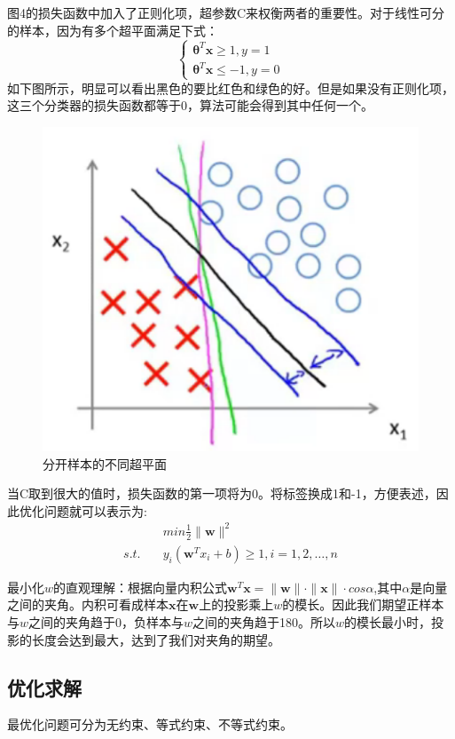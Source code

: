 \documentclass[UTF8]{ctexart} %
\begin{document}
\begin{multicols}{2}
				图4的损失函数中加入了正则化项，超参数C来权衡两者的重要性。对于线性可分的样本，因为有多个超平面满足下式：
				\[\begin{cases}
				\bm{\theta}^T\bm{x}\geq1,y=1\\
				\bm{\theta}^T\bm{x}\leq-1,y=0
				\end{cases}\]
				如下图所示，明显可以看出黑色的要比红色和绿色的好。但是如果没有正则化项，这三个分类器的损失函数都等于0，算法可能会得到其中任何一个。
				\begin{figure}[H]
					\centering\includegraphics[scale=0.3]{5.png}
					\caption{分开样本的不同超平面}
				\end{figure}
				
				当C取到很大的值时，损失函数的第一项将为0。将标签换成1和-1，方便表述，因此优化问题就可以表示为:
				\begin{align}
				&\quad min\frac{1}{2}\|\bm{w}\|^2\nonumber\\
				s.t.& \quad y_i(\bm{w}^Tx_i+b)\geq1, i=1,2,\dots,n\nonumber
				\end{align}
				
				最小化$w$的直观理解：根据向量内积公式$\bm{w}^T\bm{x}=\|\bm{w}\|\cdot \|\bm{x}\|\cdot cos\alpha$,其中$\alpha$是向量之间的夹角。内积可看成样本$\bm{x}$在$\bm{w}$上的投影乘上$w$的模长。因此我们期望正样本与$w$之间的夹角趋于0，负样本与$w$之间的夹角趋于180。所以$w$的模长最小时，投影的长度会达到最大，达到了我们对夹角的期望。
			\subsection{优化求解}
				最优化问题可分为无约束、等式约束、不等式约束。
				

\end{multicols}
\end{document}
